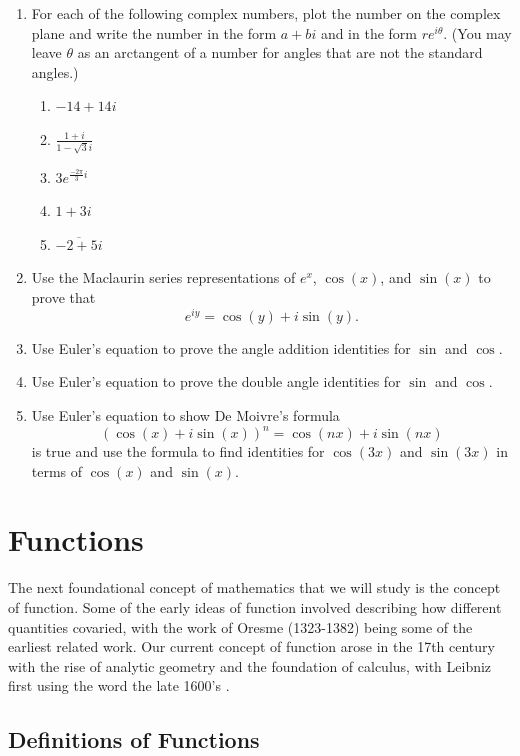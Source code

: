 \documentclass[
]{book}
\theoremstyle{definition}
\theoremstyle{definition}
\theoremstyle{definition}
\theoremstyle{definition}
\theoremstyle{remark}
\begin{document}
\begin{enumerate}
\def\labelenumi{\arabic{enumi}.}
\item
  For each of the following complex numbers, plot the number on the complex plane and write the number in the form \(a+bi\) and in the form \(re^{i\theta}\). (You may leave \(\theta\) as an arctangent of a number for angles that are not the standard angles.)

  \begin{enumerate}
  \def\labelenumii{\alph{enumii}.}
  \item
    \(-14+14i\)
  \item
    \(\displaystyle{\frac{1+i}{1-\sqrt{3}i}}\)
  \item
    \(\displaystyle{3e^{\frac{-2\pi}{3}i}}\)
  \item
    \(1+3i\)
  \item
    \(\displaystyle{\overline{-2+5i}}\)
  \end{enumerate}
\item
  Use the Maclaurin series representations of \(e^x\), \(\cos(x)\), and \(\sin(x)\) to prove that \[e^{iy}=\cos(y) + i \sin(y).\]
\item
  Use Euler's equation to prove the angle addition identities for \(\sin\) and \(\cos\).
\item
  Use Euler's equation to prove the double angle identities for \(\sin\) and \(\cos\).
\item
  Use Euler's equation to show De Moivre's formula
  \[\left(\cos(x) + i \sin(x) \right)^n = \cos(nx) + i\sin(nx) \] is true and use the formula to find identities for \(\cos(3x)\) and \(\sin(3x)\) in terms of \(\cos(x)\) and \(\sin(x)\).
\end{enumerate}

\hypertarget{ch:function}{%
\chapter{Functions}\label{ch:function}}

The next foundational concept of mathematics that we will study is the concept of function. Some of the early ideas of function involved describing how different quantities covaried, with the work of Oresme (1323-1382) being some of the earliest related work. Our current concept of function arose in the 17th century with the rise of analytic geometry and the foundation of calculus, with Leibniz first using the word the late 1600's \citep{Ponte1992}.

\hypertarget{sec:Function-Def}{%
\section{Definitions of Functions}\label{sec:Function-Def}}
\end{document}
